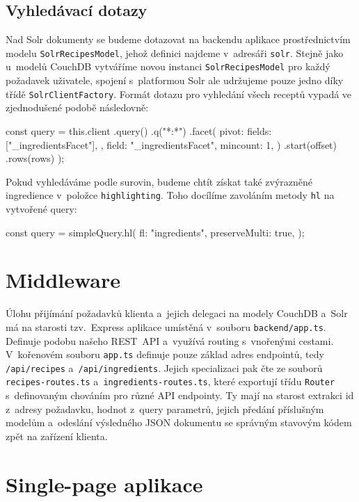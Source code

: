\subsection{Vyhledávací dotazy}

Nad Solr dokumenty se budeme dotazovat na backendu aplikace prostřednictvím modelu \texttt{SolrRecipesModel}, jehož definici najdeme v~adresáři \texttt{solr}. Stejně jako u~modelů CouchDB vytváříme novou instanci \texttt{SolrRecipesModel} pro každý požadavek uživatele, spojení s~platformou Solr ale udržujeme pouze jedno díky třídě \texttt{SolrClientFactory}. Formát dotazu pro vyhledání všech receptů vypadá ve zjednodušené podobě následovně:
\begingroup
\samepage
\begin{code}
const query = this.client
  .query()
  .q("*:*")
  .facet({
    pivot: {
      fields: ["_ingredientsFacet"],
    },
    field: "_ingredientsFacet",
    mincount: 1,
  })
  .start(offset)
  .rows(rows)
);
\end{code}
\endgroup

Pokud vyhledáváme podle surovin, budeme chtít získat také zvýrazněné ingredience v~položce \texttt{highlighting}. Toho docílíme zavoláním metody \texttt{hl} na vytvořené query:
\begingroup
\samepage
\begin{code}
const query = simpleQuery.hl({
  fl: "ingredients",
  preserveMulti: true,
});
\end{code}
\endgroup

\section{Middleware}

Úlohu přijímání požadavků klienta a~jejich delegaci na modely CouchDB a~Solr má na starosti tzv.~Express aplikace umístěná v~souboru \texttt{backend/app.ts}. Definuje podobu našeho REST~API a~využívá routing s~vnořenými cestami. V~kořenovém souboru \texttt{app.ts} definuje pouze základ adres endpointů, tedy \texttt{/api/recipes} a~\texttt{/api/ingredients}. Jejich specializaci pak čte ze souborů \texttt{recipes-routes.ts} a~\texttt{ingredients-routes.ts}, které exportují třídu \texttt{Router} s~definovaným chováním pro různé API endpointy. Ty mají na starost extrakci id z~adresy požadavku, hodnot z~query parametrů, jejich předání příslušným modelům a~odeslání výsledného JSON dokumentu se správným stavovým kódem zpět na zařízení klienta.

\section{Single-page aplikace}

